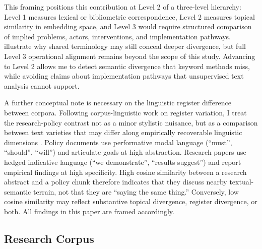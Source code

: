 \documentclass[12pt,a4paper]{article}
\begin{document}
This framing positions this contribution at Level 2 of a three-level hierarchy: Level 1 measures lexical or bibliometric correspondence, Level 2 measures topical similarity in embedding space, and Level 3 would require structured comparison of implied problems, actors, interventions, and implementation pathways. \textcite{ToneyWails2024} illustrate why shared terminology may still conceal deeper divergence, but full Level 3 operational alignment remains beyond the scope of this study. Advancing to Level 2 allows me to detect semantic divergence that keyword methods miss, while avoiding claims about implementation pathways that unsupervised text analysis cannot support.

A further conceptual note is necessary on the linguistic register difference between corpora. Following corpus-linguistic work on register variation, I treat the research-policy contrast not as a minor stylistic nuisance, but as a comparison between text varieties that may differ along empirically recoverable linguistic dimensions \parencite{biber1988variation}. Policy documents use performative modal language (``must'', ``should'', ``will'') and articulate goals at high abstraction. Research papers use hedged indicative language (``we demonstrate'', ``results suggest'') and report empirical findings at high specificity. High cosine similarity between a research abstract and a policy chunk therefore indicates that they discuss nearby textual-semantic terrain, not that they are ``saying the same thing.'' Conversely, low cosine similarity may reflect substantive topical divergence, register divergence, or both. All findings in this paper are framed accordingly.

\subsection{Research Corpus}
\end{document}
